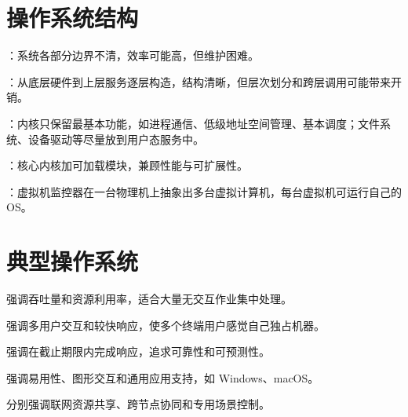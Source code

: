 \section{操作系统结构}
\begin{points}
  \item {}：系统各部分边界不清，效率可能高，但维护困难。
  \item {}：从底层硬件到上层服务逐层构造，结构清晰，但层次划分和跨层调用可能带来开销。
  \item {}：内核只保留最基本功能，如进程通信、低级地址空间管理、基本调度；文件系统、设备驱动等尽量放到用户态服务中。
  \item {}：核心内核加可加载模块，兼顾性能与可扩展性。
  \item {}：虚拟机监控器在一台物理机上抽象出多台虚拟计算机，每台虚拟机可运行自己的 OS。
\end{points}


\section{典型操作系统}
\begin{points}
  \item {}强调吞吐量和资源利用率，适合大量无交互作业集中处理。
  \item {}强调多用户交互和较快响应，使多个终端用户感觉自己独占机器。
  \item {}强调在截止期限内完成响应，追求可靠性和可预测性。
  \item {}强调易用性、图形交互和通用应用支持，如 Windows、macOS。
  \item {}分别强调联网资源共享、跨节点协同和专用场景控制。
\end{points}
